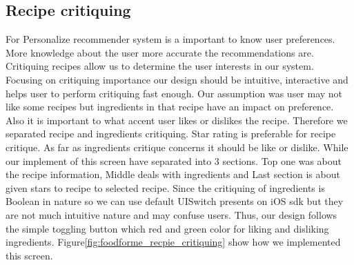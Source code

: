 \subsection{Recipe critiquing} 
For Personalize recommender system is a important to know user preferences. More knowledge about the user more accurate the recommendations are. Critiquing recipes allow us to determine the user interests in our system. Focusing on critiquing importance our design should be intuitive, interactive and helps user to perform critiquing fast enough. Our assumption was user may not like some recipes but ingredients in that recipe have an impact on preference. Also it is important to what accent user likes or dislikes the recipe. Therefore we separated recipe and ingredients critiquing. Star rating is preferable for recipe critique. As far as ingredients critique concerns it should be like or dislike. While our implement of this screen have separated into 3 sections. Top one was about the recipe information, Middle deals with ingredients and Last section is about given stars to recipe to selected recipe.  Since the critiquing of ingredients is Boolean in nature so we can use default UISwitch presents on iOS sdk but they are not much intuitive nature and may confuse users. Thus, our design follows the simple toggling button which red and green color for liking and disliking ingredients. Figure\ref{fig:foodforme_recpie_critiquing} show how we implemented this screen.


